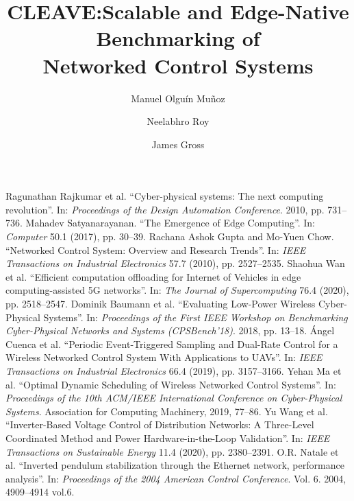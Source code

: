 \documentclass[sigconf,9pt,natbib=false,nonacm=true]{acmart}
\title[CLEAVE]{CLEAVE:\@ Scalable and Edge-Native Benchmarking of\\{Networked Control Systems}}
\author{Manuel {Olguín Muñoz}}
\affiliation{%
\institution{KTH Royal Institute of Technology}%
\city{Stockholm}%
\country{Sweden}%
}
\author{Neelabhro Roy}
\affiliation{%
\institution{KTH Royal Institute of Technology}%
\city{Stockholm}%
\country{Sweden}%
}
\author{James Gross}
\affiliation{%
\institution{KTH Royal Institute of Technology}%
\city{Stockholm}%
\country{Sweden}%
}
\begin{document}
\maketitle
\renewcommand{\shortauthors}{{Olguín Muñoz} et al.}







\begin{thebibliography}{99}
  Ragunathan Rajkumar et al. “Cyber-physical systems: The next computing revolution”. In: \emph{Proceedings of the Design Automation Conference}. 2010, pp. 731–736.
  Mahadev Satyanarayanan. “The Emergence of Edge Computing”. In: \emph{Computer} 50.1 (2017), pp. 30–39.
  Rachana Ashok Gupta and Mo-Yuen Chow. “Networked Control System: Overview and Research Trends”. In: \emph{IEEE Transactions on Industrial Electronics} 57.7 (2010), pp. 2527–2535. %
  Shaohua Wan et al. “Efficient computation offloading for {Internet of Vehicles} in edge computing-assisted 5G networks”. In: \emph{The Journal of Supercomputing} 76.4 (2020), pp. 2518–2547. %
  Dominik Baumann et al. “Evaluating Low-Power Wireless Cyber-Physical Systems”. In: \emph{Proceedings of the First IEEE Workshop on Benchmarking Cyber-Physical Networks and Systems (CPSBench’18)}. 2018, pp. 13–18.
  Ángel Cuenca et al. “Periodic Event-Triggered Sampling and Dual-Rate Control for a Wireless Networked Control System With Applications to {UAVs}”. In: \emph{IEEE Transactions on Industrial Electronics} 66.4 (2019), pp. 3157–3166.
  Yehan Ma et al. “Optimal Dynamic Scheduling of Wireless Networked Control Systems”. In: \emph{Proceedings of the 10th ACM/IEEE International Conference on Cyber-Physical Systems}. Association for Computing Machinery, 2019, 77–86.
  Yu Wang et al. “Inverter-Based Voltage Control of Distribution Networks: A Three-Level Coordinated Method and Power Hardware-in-the-Loop Validation”. In: \emph{IEEE Transactions on Sustainable Energy} 11.4 (2020), pp. 2380–2391.
  O.R. Natale et al. “Inverted pendulum stabilization through the {Ethernet} network, performance analysis”. In: \emph{Proceedings of the 2004 American Control Conference}. Vol. 6. 2004, 4909–4914 vol.6.

\end{thebibliography}
\end{document}
